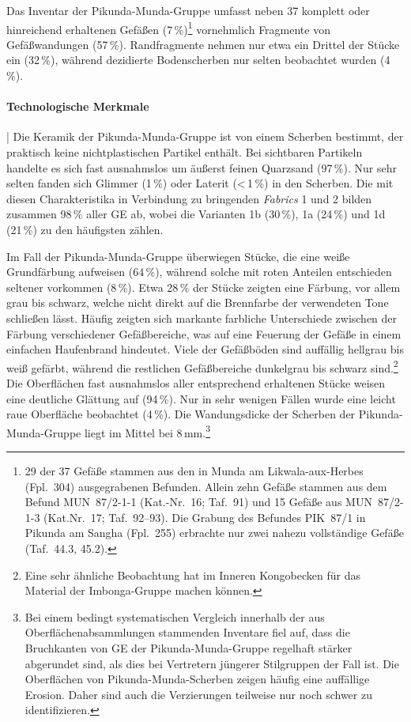 Das Inventar der Pikunda-Munda-Gruppe umfasst neben 37 komplett oder hinreichend erhaltenen Gefäßen (7\,\%)\footnote{29 der 37 Gefäße stammen aus den in Munda am \mbox{Likwala}-\mbox{aux}-\mbox{Herbes} (Fpl.~304) ausgegrabenen Befunden. Allein zehn Gefäße stammen aus dem Befund MUN~87/2-1-1 (Kat.-Nr.~16; Taf.~91) und 15 Gefäße aus MUN~87/2-1-3 (Kat.Nr.~17; Taf.~92--93). Die Grabung des Befundes PIK~87/1 in Pikunda am \mbox{Sangha} (Fpl.~255) erbrachte nur zwei nahezu vollständige Gefäße (Taf.~44.3, 45.2).} vornehmlich Fragmente von Gefäßwandungen (57\,\%). Randfragmente nehmen nur etwa ein Drittel der Stücke ein (32\,\%), während dezidierte Bodenscherben nur selten beobachtet wurden (4\,\%).

\paragraph{Technologische Merkmale}\hspace{-.5em}|\hspace{.5em}%
Die Keramik der Pikunda-Munda-Gruppe ist von einem Scherben bestimmt, der praktisch keine nichtplastischen Partikel enthält. Bei sichtbaren Partikeln handelte es sich fast ausnahmslos um äußerst feinen Quarzsand (97\,\%). Nur sehr selten fanden sich Glimmer (1\,\%) oder Laterit (\textless\,1\,\%) in den Scherben. Die mit diesen Charakteristika in Verbindung zu bringenden \textit{Fabrics} 1 und 2 bilden zusammen 98\,\% aller GE ab, wobei die Varianten 1b (30\,\%), 1a (24\,\%) und 1d (21\,\%) zu den häufigsten zählen.

Im Fall der Pikunda-Munda-Gruppe überwiegen Stücke, die eine weiße Grundfärbung aufweisen (64\,\%), während solche mit roten Anteilen entschieden seltener vorkommen (8\,\%). Etwa 28\,\% der Stücke zeigten eine Färbung, vor allem grau bis schwarz, welche nicht direkt auf die Brennfarbe der verwendeten Tone schließen lässt. Häufig zeigten sich markante farbliche Unterschiede zwischen der Färbung verschiedener Gefäßbereiche, was auf eine Feuerung der Gefäße in einem einfachen Haufenbrand hindeutet. Viele der Gefäßböden sind auffällig hellgrau bis weiß gefärbt, während die restlichen Gefäßbereiche dunkelgrau bis schwarz sind.\footnote{Eine sehr ähnliche Beobachtung hat \textcite[60]{Wotzka.1995} im Inneren Kongobecken für das Material der Imbonga-Gruppe machen können.} Die Oberflächen fast ausnahmslos aller entsprechend erhaltenen Stücke weisen eine deutliche Glättung auf (94\,\%). Nur in sehr wenigen Fällen wurde eine leicht raue Oberfläche beobachtet (4\,\%). Die Wandungsdicke der Scherben der Pikunda-Munda-Gruppe liegt im Mittel bei 8\,mm.\footnote{Bei einem bedingt systematischen Vergleich innerhalb der aus Oberflächenabsammlungen stammenden Inventare fiel auf, dass die Bruchkanten von GE der Pikunda-Munda-Gruppe regelhaft stärker abgerundet sind, als dies bei Vertretern jüngerer Stilgruppen der Fall ist. Die Oberflächen von Pikunda-Munda-Scherben zeigen häufig eine auffällige Erosion. Daher sind auch die Verzierungen teilweise nur noch schwer zu identifizieren.}

